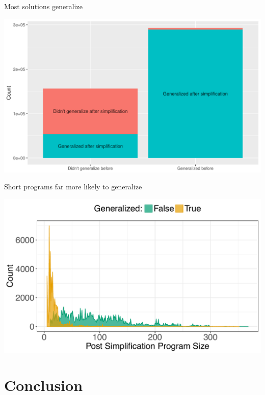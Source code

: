 \documentclass{beamer}
\begin{document}
\begin{frame}{Most solutions generalize}

\begin{center}
	\includegraphics[width=\linewidth]{Illustrations/Generalization_counts}
\end{center}


\end{frame}

\begin{frame}{Short programs far more likely to generalize}
\begin{center}
	\includegraphics[width=0.9\linewidth]{Illustrations/Size_Density_final}
\end{center}

\end{frame}

\section{Conclusion}
\end{document}
